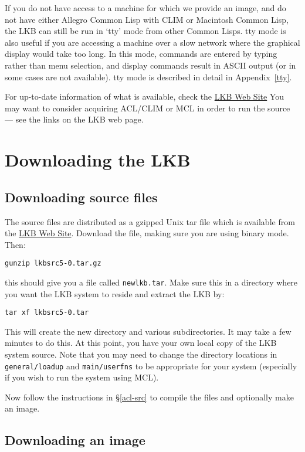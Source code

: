 \documentclass[12pt]{report}
\begin{document}
If you do not have access to a machine for which we provide an image,
and do not have either Allegro Common Lisp with CLIM or Macintosh Common
Lisp, the LKB can still be run in `tty' mode from other Common Lisps.
tty mode is also useful if you are accessing a machine over a slow network
where the graphical display would take too long.
In this mode, commands are entered by typing rather than menu selection,
and display commands result in ASCII output (or in some cases are
not available).
tty mode is described in detail in Appendix~\ref{tty}.

For up-to-date information of what is available, check the 
\href{http://www-csli.stanford.edu/~aac/lkb.html}{LKB Web Site}
You may want
to consider acquiring ACL/CLIM or MCL in order to run the source
--- see the links on the LKB web page.

\section{Downloading the LKB}
\label{down}

\subsection{Downloading source files}
\label{down-src}

The source files are distributed as a 
gzipped Unix tar file which is available from the
\href{http://www-csli.stanford.edu/~aac/lkb.html}{LKB Web Site}.
Download the file, making sure you are using binary mode.
Then:
\begin{verbatim}
gunzip lkbsrc5-0.tar.gz
\end{verbatim}
this should give you a file called {\tt newlkb.tar}.  
Make sure this in a directory where you want the LKB system to reside
and extract the LKB by:
\begin{verbatim}
tar xf lkbsrc5-0.tar
\end{verbatim}
This will create the new directory and various subdirectories.
It may take a few minutes to do this.  At this point, you have 
your own local copy of the LKB system source.  Note that
you may need to change the directory locations in {\tt general/loadup}
and {\tt main/userfns}
to be appropriate for your system
(especially if you wish to run the system using MCL).


Now follow the instructions in \S\ref{acl-src} to compile the
files and optionally
make an image. 


\subsection{Downloading an image}
\label{down-images}
\end{document}

